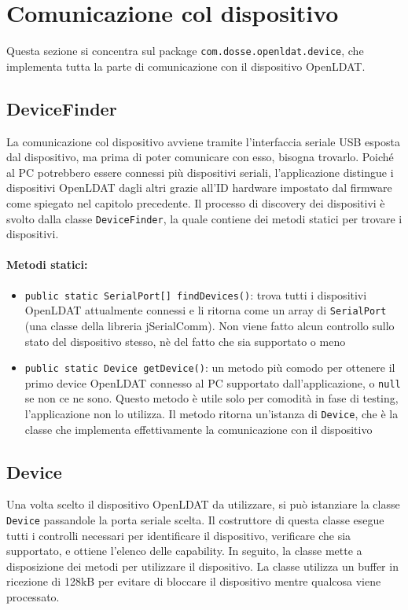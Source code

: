 \section{Comunicazione col dispositivo}
Questa sezione si concentra sul package \texttt{com.dosse.openldat.device}, che implementa tutta la parte di comunicazione con il dispositivo OpenLDAT.

\subsection{DeviceFinder}
La comunicazione col dispositivo avviene tramite l'interfaccia seriale USB esposta dal dispositivo, ma prima di poter comunicare con esso, bisogna trovarlo. Poiché al PC potrebbero essere connessi più dispositivi seriali, l'applicazione distingue i dispositivi OpenLDAT dagli altri grazie all'ID hardware impostato dal firmware come spiegato nel capitolo precedente.
Il processo di discovery dei dispositivi è svolto dalla classe \texttt{DeviceFinder}, la quale contiene dei metodi statici per trovare i dispositivi.

\paragraph{Metodi statici:}\begin{itemize}
	\item \texttt{public static SerialPort[] findDevices()}: trova tutti i dispositivi OpenLDAT attualmente connessi e li ritorna come un array di \texttt{SerialPort} (una classe della libreria jSerialComm). Non viene fatto alcun controllo sullo stato del dispositivo stesso, nè del fatto che sia supportato o meno
	\item \texttt{public static Device getDevice()}: un metodo più comodo per ottenere il primo device OpenLDAT connesso al PC supportato dall'applicazione, o \texttt{null} se non ce ne sono. Questo metodo è utile solo per comodità in fase di testing, l'applicazione non lo utilizza. Il metodo ritorna un'istanza di \texttt{Device}, che è la classe che implementa effettivamente la comunicazione con il dispositivo
\end{itemize}

\subsection{Device}
Una volta scelto il dispositivo OpenLDAT da utilizzare, si può istanziare la classe \texttt{Device} passandole la porta seriale scelta. Il costruttore di questa classe esegue tutti i controlli necessari per identificare il dispositivo, verificare che sia supportato, e ottiene l'elenco delle capability. In seguito, la classe mette a disposizione dei metodi per utilizzare il dispositivo. La classe utilizza un buffer in ricezione di 128kB per evitare di bloccare il dispositivo mentre qualcosa viene processato.

